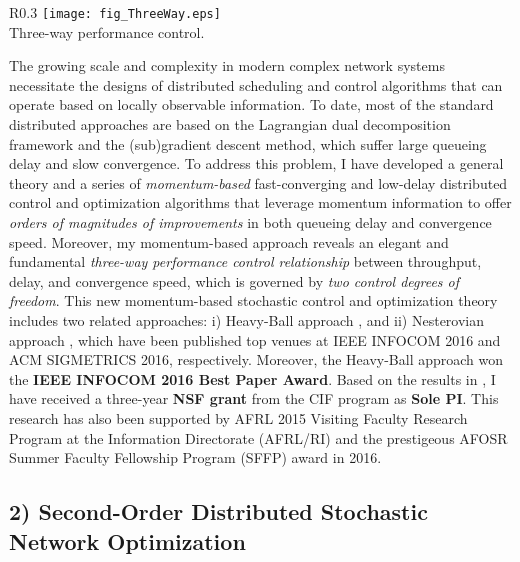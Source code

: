 \documentclass[10pt]{article}
\theoremstyle{plain} \numberwithin{equation}{section}
\theoremstyle{definition}
\begin{document}
\begin{wrapfigure}{R}{0.3\columnwidth}
\centering
\texttt{[image: fig\_ThreeWay.eps]} \\
\vspace{.0in}
{\small Three-way performance control.}
\end{wrapfigure}
The growing scale and complexity in modern complex network systems necessitate the designs of distributed scheduling and control algorithms that can operate based on locally observable information.
To date, most of the standard distributed approaches are based on the Lagrangian dual decomposition framework and the (sub)gradient descent method, which suffer large queueing delay and slow convergence.
To address this problem, I have developed a general theory and a series of {\em momentum-based} fast-converging and low-delay distributed control and optimization algorithms that leverage momentum information to offer {\em orders of magnitudes of improvements} in both queueing delay and convergence speed.
Moreover, my momentum-based approach reveals an elegant and fundamental {\em three-way performance control relationship} between throughput, delay, and convergence speed, which is governed by {\em two control degrees of freedom}.
This new momentum-based stochastic control and optimization theory includes two related approaches: i) Heavy-Ball approach \cite{Liu16:HeavyBall_INFOCOM}, and ii) Nesterovian approach \cite{Liu16:Nesterovian}, which have been published top venues at IEEE INFOCOM 2016 and ACM SIGMETRICS 2016, respectively.
Moreover, the Heavy-Ball approach won the {\bf IEEE INFOCOM 2016 Best Paper Award}.
Based on the results in \cite{Liu16:HeavyBall_INFOCOM,Liu16:Nesterovian}, I have received a three-year {\bf NSF grant} from the CIF program \cite{Liu16:CIF_Grant} as {\bf Sole PI}.
This research has also been supported by AFRL 2015 Visiting Faculty Research Program at the Information Directorate (AFRL/RI) and the prestigeous AFOSR Summer Faculty Fellowship Program (SFFP) award in 2016.



\subsection*{2) Second-Order Distributed Stochastic Network Optimization \cite{Liu12:DNewton_INFOCOM,Liu13:DNewton_INFOCOM,Liu16:DNewton_JCCR_ToN,Liu13:PER}}
\end{document}
